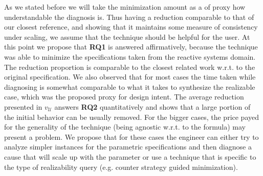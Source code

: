 As we stated before we will take the minimization amount as a of proxy how understandable the diagnosis is. Thus having a reduction comparable to that of our closest reference, and showing that it maintains some measure of consistency under scaling, we assume that the technique should be helpful for the user.
At this point we propose that \textbf{RQ1} is answered affirmatively, because the technique was able to minimize the specifications taken from the reactive systems domain. The reduction proportion is comparable to the closest related work w.r.t. to the original specification. We also observed that for most cases the time taken while diagnosing is somewhat comparable to what it takes to synthesize the realizable case, which was the proposed proxy for design intent. The average reduction presented in $v_{\mathcal{U}}$ answers \textbf{RQ2} quantitatively and shows that a large portion of the initial behavior can be usually removed.
For the bigger cases, the price payed for the generality of the technique (being agnostic w.r.t. to the formula) may present a problem. We propose that for these cases the engineer can either try to analyze simpler instances for the parametric specifications and then diagnose a cause that will scale up with the parameter or use a technique that is specific to the type of realizability query (e.g. counter strategy guided minimization).  
